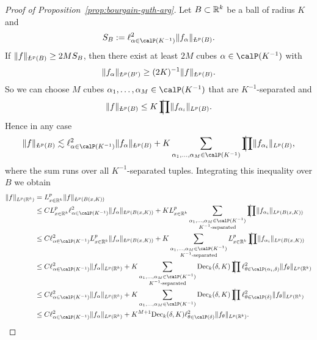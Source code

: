 \begin{proof}[Proof of Proposition~\ref{prop:bourgain-guth-arg}]
Let $B \subset \mathbb{R}^{k}$ be a ball of radius $K$ and
\[
S_{B} := \ell^{2}_{\alpha\in\Part{K^{-1}}} \norm{ f_\alpha }_{\avL^{p}(B)}.
\]
If $\norm{ f }_{\avL^{p}(B)} \geq 2M S_{B}$, then there exist at least $2M$ cubes $\alpha \in \Part{K^{-1}}$ with
\[
\norm{ f_\alpha }_{\avL^{p}(B')} \geq (2K)^{-1} \norm{ f }_{\avL^{p}(B)}.
\]
So we can choose $M$ cubes $\alpha_{1},\dotsc,\alpha_{M} \in \Part{K^{-1}}$ that are $K^{-1}$-separated and
\[
\norm{ f }_{\avL^{p}(B)} \leq K \avprod \norm{ f_{\alpha_{i}} }_{L^{p}(B)}.
\]
Hence in any case
\[
\norm{ f }_{\avL^{p}(B)} \lesssim
\ell^{2}_{\alpha\in\Part{K^{-1}}} \norm{ f_\alpha }_{\avL^{p}(B)}
+
K \sum_{\alpha_{1},\dotsc,\alpha_{M} \in \Part{K^{-1}}} \avprod \norm{ f_{\alpha_{i}} }_{L^{p}(B)},
\]
where the sum runs over all $K^{-1}$-separated tuples.
Integrating this inequality over $B$ we obtain
\begin{align*}
\norm{ f }_{L^{p}(\R^{k})}
&=
L^{p}_{x \in \R^{k}} \norm{ f }_{\avL^{p}(B(x,K))}
\\ &\leq
C L^{p}_{x \in \R^{k}} \ell^{2}_{\alpha\in\Part{K^{-1}}} \norm{ f_\alpha }_{\avL^{p}(B(x,K))}
+
K L^{p}_{x \in \R^{k}} \sum_{\substack{\alpha_{1},\dotsc,\alpha_{M} \in \Part{K^{-1}} \\ K^{-1}\text{-separated}}} \avprod \norm{ f_{\alpha_{i}} }_{L^{p}(B(x,K))}
\\ &\leq
C \ell^{2}_{\alpha\in\Part{K^{-1}}} L^{p}_{x \in \R^{k}} \norm{ f_\alpha }_{\avL^{p}(B(x,K))}
+
K \sum_{\substack{\alpha_{1},\dotsc,\alpha_{M} \in \Part{K^{-1}} \\ K^{-1}\text{-separated}}} L^{p}_{x \in \R^{k}} \avprod \norm{ f_{\alpha_{i}} }_{L^{p}(B(x,K))}
\\ &\leq
C \ell^{2}_{\alpha\in\Part{K^{-1}}} \norm{ f_\alpha }_{L^{p}(\R^{k})}
+
K \sum_{\substack{\alpha_{1},\dotsc,\alpha_{M} \in \Part{K^{-1}} \\ K^{-1}\text{-separated}}} \Dec_{k}(\delta,K) \avprod \ell^{2}_{\theta \in \Part[\alpha_{i}]{\delta}} \norm{ f_{\theta} }_{L^{p}(\R^{k})}
\\ &\leq
C \ell^{2}_{\alpha\in\Part{K^{-1}}} \norm{ f_\alpha }_{L^{p}(\R^{k})}
+
K \sum_{\alpha_{1},\dotsc,\alpha_{M} \in \Part{K^{-1}}} \Dec_{k}(\delta,K) \avprod \ell^{2}_{\theta \in \Part{\delta}} \norm{ f_{\theta} }_{L^{p}(\R^{k})}
\\ &\leq
C \ell^{2}_{\alpha\in\Part{K^{-1}}} \norm{ f_\alpha }_{L^{p}(\R^{k})}
+
K^{M+1} \Dec_{k}(\delta,K) \ell^{2}_{\theta \in \Part{\delta}} \norm{ f_{\theta} }_{L^{p}(\R^{k})}.
\qedhere
\end{align*}
\end{proof}

